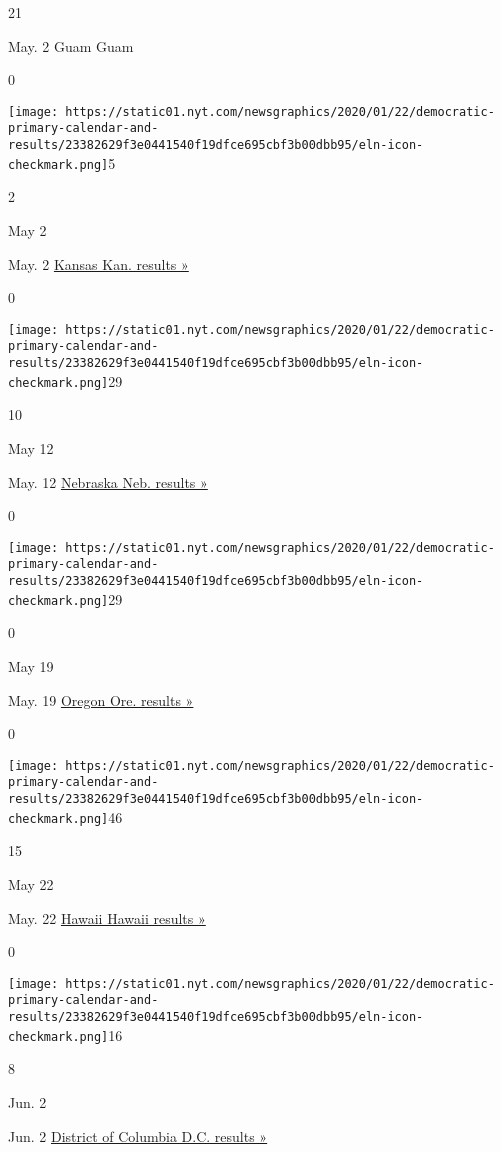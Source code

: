 21

May. 2 Guam Guam

0

\texttt{[image: https://static01.nyt.com/newsgraphics/2020/01/22/democratic-primary-calendar-and-results/23382629f3e0441540f19dfce695cbf3b00dbb95/eln-icon-checkmark.png]}5

2

May 2

May. 2
\href{https://www.nytimes.com/interactive/2020/05/02/us/elections/results-kansas-president-democrat-primary-election.html}{Kansas
Kan. results »}

0

\texttt{[image: https://static01.nyt.com/newsgraphics/2020/01/22/democratic-primary-calendar-and-results/23382629f3e0441540f19dfce695cbf3b00dbb95/eln-icon-checkmark.png]}29

10

May 12

May. 12
\href{https://www.nytimes.com/interactive/2020/05/12/us/elections/results-nebraska-primary-elections.html}{Nebraska
Neb. results »}

0

\texttt{[image: https://static01.nyt.com/newsgraphics/2020/01/22/democratic-primary-calendar-and-results/23382629f3e0441540f19dfce695cbf3b00dbb95/eln-icon-checkmark.png]}29

0

May 19

May. 19
\href{https://www.nytimes.com/interactive/2020/05/19/us/elections/results-oregon-primary-elections.html}{Oregon
Ore. results »}

0

\texttt{[image: https://static01.nyt.com/newsgraphics/2020/01/22/democratic-primary-calendar-and-results/23382629f3e0441540f19dfce695cbf3b00dbb95/eln-icon-checkmark.png]}46

15

May 22

May. 22
\href{https://www.nytimes.com/interactive/2020/05/23/us/elections/results-hawaii-president-democrat-primary-election.html}{Hawaii
Hawaii results »}

0

\texttt{[image: https://static01.nyt.com/newsgraphics/2020/01/22/democratic-primary-calendar-and-results/23382629f3e0441540f19dfce695cbf3b00dbb95/eln-icon-checkmark.png]}16

8

Jun. 2

Jun. 2
\href{https://www.nytimes.com/interactive/2020/06/02/us/elections/results-district-of-columbia-primary-elections.html}{District
of Columbia D.C. results »}


